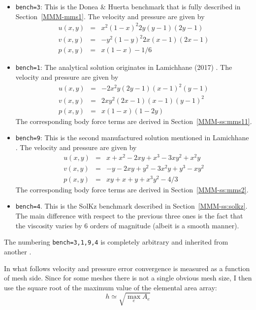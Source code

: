 \begin{itemize}
\item {\tt bench=3}: 
This is the Donea \& Huerta benchmark that is fully described in Section~\ref{MMM-mms1}.
The velocity and pressure are given by
\begin{eqnarray}
u(x,y) &=& x^2(1-x)^2 2y (y-1)(2y-1) \\ 
v(x,y) &=& -y^2 (1 - y)^2 2x (x-1)(2x-1) \\ 
p(x,y) &=& x(1 -x)- 1/6 
\end{eqnarray}

\item {\tt bench=1}:  
The analytical solution originates in Lamichhane (2017) \cite{lami17}.
The velocity and pressure are given by
\begin{eqnarray}
u(x,y)&=&-2x^2y(2y-1)(x-1)^2(y-1) \\
v(x,y)&=& 2xy^2(2x-1)(x-1)(y-1)^2 \\
p(x,y)&=& x(1-x)(1-2y)
\end{eqnarray}
The corresponding body force terms are derived in Section~\ref{MMM-ss:mms11}. 

\item {\tt bench=9}: 
This is the second manufactured solution 
mentioned in Lamichhane \cite{lami17}. 
The velocity and pressure are given by
\begin{eqnarray}
u(x,y) &=& x+x^2 - 2xy+x^3 - 3xy^2 + x^2y \\
v(x,y) &=& -y-2xy+y^2 -3x^2y + y^3 - xy^2 \\
p(x,y) &=& xy+x+y+x^3y^2 - 4/3
\end{eqnarray}
The corresponding body force terms are derived in Section~\ref{MMM-ss:mms2}. 

\item {\tt bench=4}. This is the SolKz benchmark described in Section~\ref{MMM-ss:solkz}.
The main difference with respect to the previous three ones is the fact that the viscosity
varies by 6 orders of magnitude (albeit is a smooth manner).


\end{itemize}

The numbering {\tt bench=3,1,9,4} is completely arbitrary and inherited from another \stone.

In what follows velocity and pressure error convergence is measured as a function of
mesh side. Since for some meshes there is not a single obvious mesh size, 
I then use the square root of the maximum value of the elemental area array:
\[
h \simeq \sqrt{\max_e A_e }
\]


